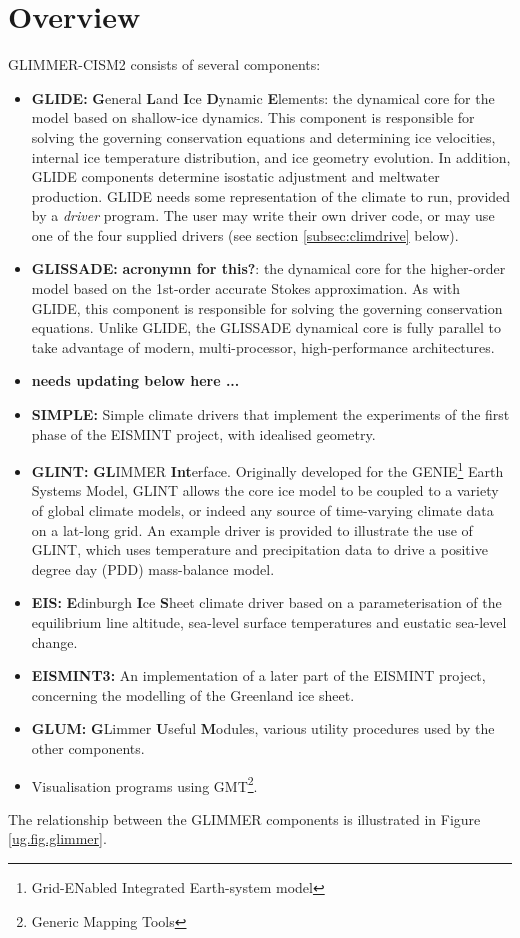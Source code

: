 \section{Overview}
%
GLIMMER-CISM2 consists of several components:
%
\begin{itemize}
\item {\bf GLIDE:} {\bf G}eneral {\bf L}and {\bf I}ce {\bf D}ynamic {\bf E}lements: the dynamical core for the model based on shallow-ice dynamics. This component is responsible for solving the governing conservation equations and determining ice velocities, internal ice temperature distribution, and ice geometry evolution. In addition, GLIDE components determine isostatic adjustment and meltwater production. GLIDE needs some representation of the climate to run, provided by a {\it driver} program. The user may write their own driver code, or may use one of the four supplied drivers (see section \ref{subsec:climdrive} below).
\item {\bf GLISSADE:} {\bf acronymn for this?}: the dynamical core for the higher-order model based on the 1st-order accurate Stokes approximation. As with GLIDE, this component is responsible for solving the governing conservation equations. Unlike GLIDE, the GLISSADE dynamical core is fully parallel to take advantage of modern, multi-processor, high-performance architectures.

\item {\bf needs updating below here ...}
\item {\bf SIMPLE:} Simple climate drivers that implement the experiments of the first phase of the EISMINT project, with idealised geometry. 
\item {\bf GLINT:} {\bf GL}IMMER {\bf Int}erface. Originally developed for the GENIE\footnote{Grid-ENabled Integrated Earth-system model} Earth Systems Model, GLINT allows the core ice model to be coupled to a variety of global climate models, or indeed any source of time-varying climate data on a lat-long grid. An example driver is provided to illustrate the use of GLINT, which uses temperature and precipitation data to drive a positive degree day (PDD) mass-balance model.
\item {\bf EIS:} {\bf E}dinburgh {\bf I}ce {\bf S}heet climate driver based on a parameterisation of the equilibrium line altitude, sea-level surface temperatures and eustatic sea-level change.
\item {\bf EISMINT3:} An implementation of a later part of the EISMINT project, concerning the modelling of the Greenland ice sheet.
\item {\bf GLUM:} {\bf G}Limmer {\bf U}seful {\bf M}odules, various utility procedures used by the other components.
\item Visualisation programs using GMT\footnote{Generic Mapping Tools}.
\end{itemize}
%
The relationship between the GLIMMER components is illustrated in Figure \ref{ug.fig.glimmer}. 
%
